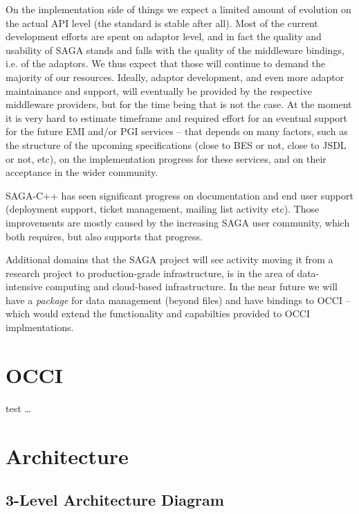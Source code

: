 \documentclass[10pt,conference,final,letterpaper,twoside,twocolumn,]{IEEEtran}
\begin{document}
 On the implementation side of things we expect a limited amount of
 evolution on the actual API level (the standard is stable after all).
 Most of the current development efforts are spent on adaptor level, and
 in fact the quality and usability of SAGA stands and falls with the
 quality of the middleware bindings, i.e. of the adaptors.  We thus
 expect that those will continue to demand the majority of our
 resources.  Ideally, adaptor development, and even more adaptor
 maintainance and support, will eventually be provided by the respective
 middleware providers, but for the time being that is not the case.  At
 the moment it is very hard to estimate timeframe and required effort
 for an eventual support for the future EMI and/or PGI services -- that
 depends on many factors, such as the structure of the upcoming
 specifications (close to BES or not, close to JSDL or not, etc), on the
 implementation progress for these services, and on their acceptance in
 the wider community.

 SAGA-C++ has seen significant progress on documentation and end user
 support (deployment support, ticket management, mailing list activity
 etc).  Those improvements are mostly caused by the increasing SAGA
 user community, which both requires, but also supports that progress.

 Additional domains that the SAGA project will see activity moving it
 from a research project to production-grade infrastructure, is in the
 area of data-intensive computing and cloud-based infrastructure. In
 the near future we will have a {\it package} for data management
 (beyond files) and have bindings to OCCI -- which would extend the
 functionality and capabilties provided to OCCI implmentations.

\section{OCCI}

test \ldots

\section{Architecture}

\subsection{3-Level Architecture Diagram}

% 
% 
\end{document}
